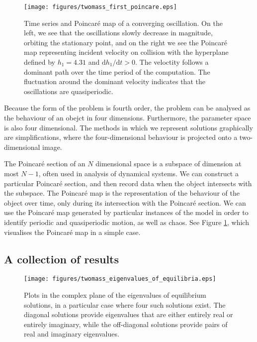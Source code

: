 \documentclass{article}
\begin{document}
\begin{figure}
    \centering
    \texttt{[image: figures/twomass\_first\_poincare.eps]}
    \caption{
        Time series and Poincar\'e map of a converging oscillation.
        On the left, we see that the oscillations slowly decrease in magnitude, orbiting the stationary point,
        and on the right we see the Poincar\'e map representing incident velocity on collision with the hyperplane defined by $h_1 = 4.31$ and $\mathrm{d}h_1/\mathrm{d}t >0$.
        The veloctity follows a dominant path over the time period of the computation.
        The fluctuation around the dominant velocity indicates that the oscillations are quasiperiodic.
    }
    \label{fig:twomass_first_poincare}
\end{figure}

Because the form of the problem is fourth order,
the problem can be analysed as the behaviour of an obejct in four dimensions.
Furthermore, the parameter space is also four dimensional.
The methods in which we represent solutions graphically are simplifications,
where the four-dimensional behaviour is projected onto a two-dimensional image.

The Poincar\'e section of an $N$ dimensional space is a subspace of dimension at most $N-1$,
often used in analysis of dynamical systems. We can construct a particular Poincar\'e section,
and then record data when the object intersects with the subspace.
The Poincar\'e map is the representation of the behaviour of the object over time,
only during its intersection with the Poincar\'e section.
We can use the Poincar\'e map generated by particular instances of the model in order to identify periodic and quasiperiodic motion, as well as chaos.
See Figure \ref{fig:twomass_first_poincare}, which visualises the Poincar\'e map in a simple case.

\subsection{A collection of results}

\begin{figure}
    \centering
    \texttt{[image: figures/twomass\_eigenvalues\_of\_equilibria.eps]}
    \caption{Plots in the complex plane of the eigenvalues of equilibrium solutions,
    in a particular case where four such solutions exist.
    The diagonal solutions provide eigenvalues that are either entirely real or entirely imaginary,
    while the off-diagonal solutions provide pairs of real and imaginary eigenvalues.}
    \label{fig:twomass_argand_eigenvalues}
\end{figure}
\end{document}
